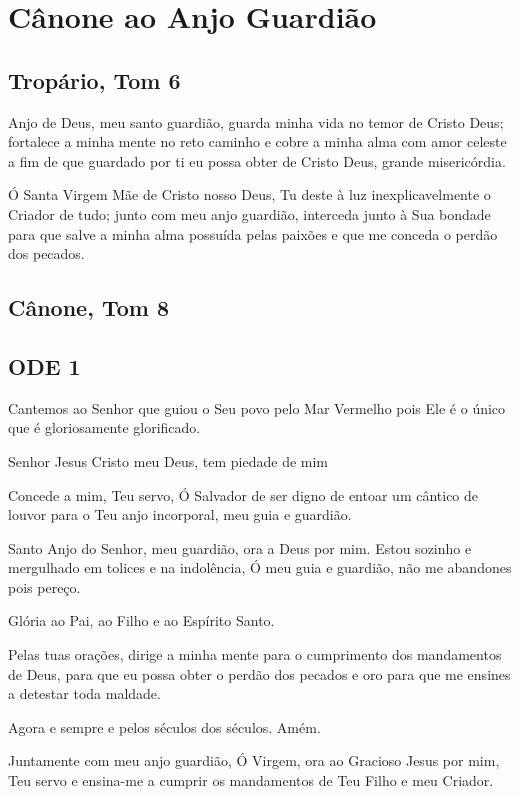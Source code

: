 \documentclass{subfiles}
\begin{document}
\chapter{Cânone ao Anjo Guardião}

\section*{Tropário, Tom 6}

Anjo de Deus, meu santo guardião, guarda minha vida no temor de
Cristo Deus; fortalece a minha mente no reto caminho e cobre a minha alma
com amor celeste a fim de que guardado por ti eu possa obter de Cristo Deus,
grande misericórdia.

\theotokion{}Ó Santa Virgem Mãe de Cristo nosso Deus, Tu deste à luz
inexplicavelmente o Criador de tudo; junto com meu anjo guardião, interceda
junto à Sua bondade para que salve a minha alma possuída pelas paixões e que
me conceda o perdão dos pecados.

\section*{Cânone, Tom 8}

\section*{ODE 1}

\eirmos{}Cantemos ao Senhor que guiou o Seu povo pelo Mar Vermelho pois Ele
é o único que é gloriosamente glorificado.

Senhor Jesus Cristo meu Deus, tem piedade de mim

\textbf{}Concede a mim, Teu servo, Ó Salvador de ser
digno de entoar um cântico de louvor para o Teu anjo incorporal, meu guia e
guardião.

Santo Anjo do Senhor, meu guardião, ora a Deus por mim.
Estou sozinho e mergulhado em tolices e na indolência, Ó meu guia e
guardião, não me abandones pois pereço.

Glória ao Pai, ao Filho e ao Espírito Santo.

Pelas tuas orações, dirige a minha mente para o cumprimento dos
mandamentos de Deus, para que eu possa obter o perdão dos pecados e oro
para que me ensines a detestar toda maldade.

Agora e sempre e pelos séculos dos séculos. Amém.

Juntamente com meu anjo guardião, Ó Virgem, ora ao Gracioso Jesus
por mim, Teu servo e ensina-me a cumprir os mandamentos de Teu Filho e
meu Criador.
\end{document}
